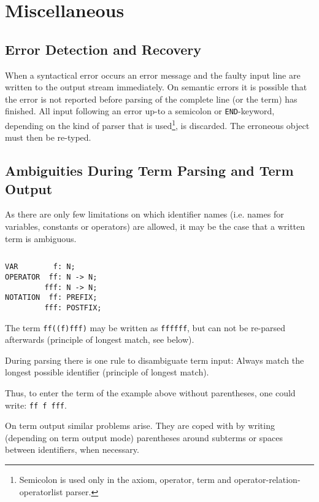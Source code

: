 \section{Miscellaneous}

\subsection{Error Detection and Recovery}
When a syntactical error occurs an error message and the faulty
input line are written to the output stream immediately.
On semantic errors it is possible that the error is not reported
before parsing of the complete line (or the term) has finished.
All input following an error up-to a semicolon or {\tt END}-keyword,
depending on the kind of parser that is used\footnote{Semicolon is
used only in the axiom, operator, term and operator-relation-operatorlist parser.},
is discarded.
The erroneous object must then be re-typed.

\subsection{Ambiguities During Term Parsing and Term Output}
As there are only few limitations on which identifier names
(i.e. names for variables, constants or operators) are allowed,
it may be the case that a written term is ambiguous.
\begin{example} $ $
\begin{verbatim}
VAR        f: N;
OPERATOR  ff: N -> N;
         fff: N -> N;
NOTATION  ff: PREFIX;
         fff: POSTFIX;
\end{verbatim}
{\rm
The term {\tt ff((f)fff)} may be written as {\tt ffffff}, but can not
be re-parsed afterwards (principle of longest match, see below).
}
\end{example}
During parsing there is one rule to disambiguate term input: Always
match the longest possible identifier (principle of longest match).

Thus, to enter the term of the example above without parentheses, one
could write: {\tt ff f fff}.

On term output similar problems arise. They are coped with by
writing (depending on term output mode) parentheses around subterms
or spaces between identifiers, when necessary.

